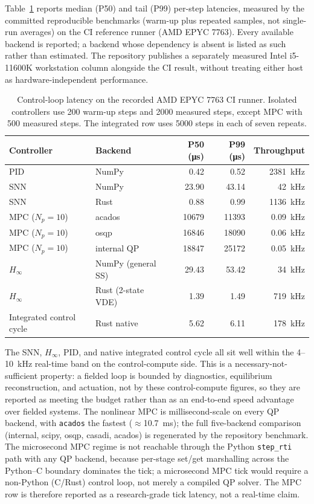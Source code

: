 \documentclass[twocolumn,preprintnumbers,amsmath,amssymb,prl,floatfix]{revtex4-2}
\begin{document}
Table~\ref{tab:timing} reports median (P50) and tail (P99) per-step latencies,
measured by the committed reproducible benchmarks (warm-up plus repeated samples,
not single-run averages) on the CI reference runner (AMD EPYC 7763). Every
available backend is reported; a backend whose dependency is absent is listed as
such rather than estimated. The repository publishes a separately measured
Intel i5-11600K workstation column alongside the CI result, without treating
either host as hardware-independent performance.

\begin{table}[tb]
\centering
\caption{Control-loop latency on the recorded AMD EPYC 7763 CI runner. Isolated
controllers use 200 warm-up steps and 2000 measured steps, except MPC with 500
measured steps. The integrated row uses 5000 steps in each of seven repeats.}
\label{tab:timing}
\begin{tabular}{llrrr}
\toprule
Controller & Backend & P50 (\si{\micro\second}) & P99 (\si{\micro\second})
  & Throughput \\
\midrule
PID          & NumPy & 0.42  & 0.52  & 2381~kHz \\
SNN          & NumPy & 23.90 & 43.14 & 42~kHz  \\
SNN          & Rust  & 0.88  & 0.99  & 1136~kHz \\
MPC ($N_p{=}10$) & acados & 10679 & 11393 & 0.09~kHz \\
MPC ($N_p{=}10$) & osqp & 16846 & 18090 & 0.06~kHz \\
MPC ($N_p{=}10$) & internal QP & 18847 & 25172 & 0.05~kHz \\
$H_\infty$   & NumPy (general SS) & 29.43 & 53.42 & 34~kHz \\
$H_\infty$   & Rust (2-state VDE) & 1.39 & 1.49 & 719~kHz \\
\midrule
Integrated control cycle & Rust native & 5.62 & 6.11 & 178~kHz \\
\bottomrule
\end{tabular}
\end{table}

The SNN, $H_\infty$, PID, and native integrated control cycle all sit well within
the 4--10~kHz real-time band on the control-compute side. This is a
necessary-not-sufficient property: a fielded loop is bounded by diagnostics,
equilibrium reconstruction, and actuation, not by these control-compute figures,
so they are reported as meeting the budget rather than as an end-to-end speed
advantage over fielded systems.
The nonlinear MPC is millisecond-scale on every QP backend, with \texttt{acados}
the fastest ($\approx$\SI{10.7}{\milli\second}); the full five-backend comparison
(internal, scipy, osqp, casadi, acados) is regenerated by the repository
benchmark. The microsecond MPC regime is not reachable through the Python
\texttt{step\_rti} path with any QP backend, because per-stage set/get marshalling
across the Python--C boundary dominates the tick; a microsecond MPC tick would
require a non-Python (C/Rust) control loop, not merely a compiled QP solver. The
MPC row is therefore reported as a research-grade tick latency, not a real-time
claim.
\end{document}
